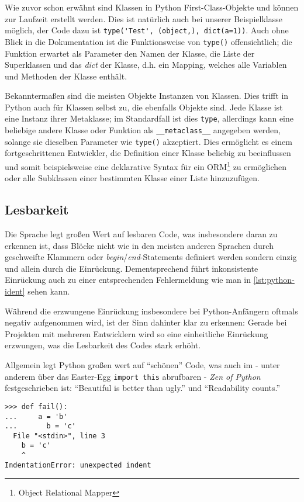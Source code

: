 Wie zuvor schon erwähnt sind Klassen in Python First-Class-Objekte und können zur Laufzeit erstellt
werden. Dies ist natürlich auch bei unserer Beispielklasse möglich, der Code dazu ist
\lstinline{type('Test', (object,), dict(a=1))}.
Auch ohne Blick in die Dokumentation ist die Funktionsweise von \lstinline{type()} offensichtlich;
die Funktion erwartet als Parameter den Namen der Klasse, die Liste der Superklassen und das
\emph{dict} der Klasse, d.h. ein Mapping, welches alle Variablen und Methoden der Klasse enthält.

Bekanntermaßen sind die meisten Objekte Instanzen von Klassen. Dies trifft in Python auch für
Klassen selbst zu, die ebenfalls Objekte sind. Jede Klasse ist eine Instanz ihrer Metaklasse; im
Standardfall ist dies \lstinline{type}, allerdings kann eine beliebige andere Klasse oder Funktion
als \lstinline{__metaclass__} angegeben werden, solange sie dieselben Parameter wie
\lstinline{type()} akzeptiert. Dies ermöglicht es einem fortgeschrittenen Entwickler, die Definition
einer Klasse beliebig zu beeinflussen und somit beispielsweise eine deklarative Syntax für ein
ORM\footnote{Object Relational Mapper} zu ermöglichen oder alle Subklassen einer bestimmten Klasse
einer Liste hinzuzufügen.



\subsection{Lesbarkeit}

Die Sprache legt großen Wert auf lesbaren Code, was insbesondere daran zu erkennen ist, dass Blöcke
nicht wie in den meisten anderen Sprachen durch geschweifte Klammern oder
\emph{begin}/\emph{end}-Statements definiert werden sondern einzig und allein durch die Einrückung.
Dementsprechend führt inkonsistente Einrückung auch zu einer entsprechenden Fehlermeldung wie man in
\autoref{lst:python-ident} sehen kann.

Während die erzwungene Einrückung insbesondere bei Python-Anfängern oftmals negativ aufgenommen
wird, ist der Sinn dahinter klar zu erkennen: Gerade bei Projekten mit mehreren Entwicklern wird so
eine einheitliche Einrückung erzwungen, was die Lesbarkeit des Codes stark erhöht.

Allgemein legt Python großen wert auf \enquote{schönen} Code, was auch im - unter anderem über das
Easter-Egg \lstinline{import this} abrufbaren - \emph{Zen of Python} festgeschrieben ist:
\enquote{Beautiful is better than ugly.} und \enquote{Readability counts.} \citep{zenofpython}

\begin{lstlisting}[caption=Fehlerhafte Einrückung,label=lst:python-ident]
>>> def fail():
...     a = 'b'
...       b = 'c'
  File "<stdin>", line 3
    b = 'c'
    ^
IndentationError: unexpected indent
\end{lstlisting}
